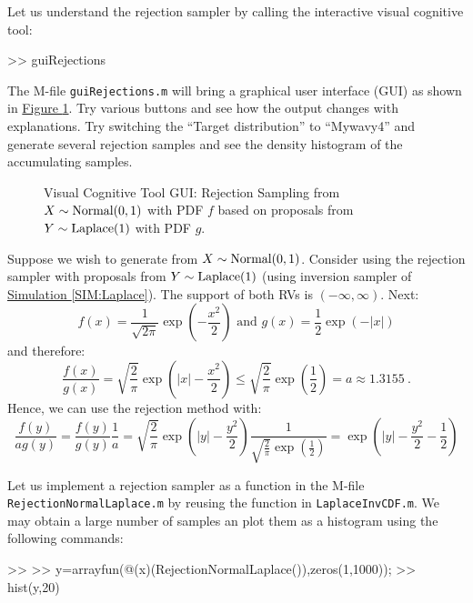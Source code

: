 \begin{labwork}\label{LW:guiRejectionsNormal01}
Let us understand the rejection sampler by calling the interactive visual cognitive tool:
\begin{VrbM}
>> guiRejections
\end{VrbM}
The M-file {\tt guiRejections.m} will bring a graphical user interface (GUI) as shown in \hyperref[F:guiRejectionsNormal01]{Figure \ref*{F:guiRejectionsNormal01}}.  Try various buttons and see how the output changes with explanations.  Try switching the ``Target distribution'' to ``Mywavy4'' and generate several rejection samples and see the density histogram of the accumulating samples.
\end{labwork}

\begin{figure}[htpb]
\caption{Visual Cognitive Tool GUI: Rejection Sampling from $X \sim \mbox{{\rm Normal}}(0,1)$ with PDF $f$ based on proposals from $Y \sim \mbox{{\rm Laplace}}(1)$ with PDF $g$.\label{F:guiRejectionsNormal01}}
\centering   {}
\end{figure}


\begin{simulation}\label{SIM:Normal01FromLaplace}
Suppose we wish to generate from $X \sim \mbox{{\rm Normal}}(0, 1)$. Consider using the rejection sampler with proposals from $Y \sim \mbox{{\rm Laplace}}(1)$ (using inversion sampler of \hyperref[SIM:Laplace]{Simulation \ref*{SIM:Laplace}}). The support of both RVs is $(-\infty,\infty)$. Next:
$$f(x)=\frac{1}{\sqrt{2\pi}}\exp\left(-\frac{x^2}{2}\right) \textrm{ and } g(x)=\frac{1}{2}\exp(-|x|)$$
and therefore:
$$\frac{f(x)}{g(x)}=\sqrt{\frac{2}{\pi}}\exp\left(|x|-\frac{x^2}{2}\right)\leq \sqrt{\frac{2}{\pi}}\exp\left(\frac{1}{2}\right) = a \approx 1.3155 \ .$$
Hence, we can use the rejection method with:
$$
\frac{f(y)}{a g(y)} = \frac{f(y)}{g(y)} \frac{1}{a} = \sqrt{\frac{2}{\pi}}\exp\left(|y|-\frac{y^2}{2}\right) \frac{1}{\sqrt{\frac{2}{\pi}}\exp\left(\frac{1}{2}\right)  } = \exp\left(|y|-\frac{y^2}{2} - \frac{1}{2} \right)
$$

Let us implement a rejection sampler as a function in the M-file {\tt RejectionNormalLaplace.m} by reusing the function in {\tt LaplaceInvCDF.m}.
We may obtain a large number of samples an plot them as a histogram using the following commands:
\begin{VrbM}
>> %
>> y=arrayfun(@(x)(RejectionNormalLaplace()),zeros(1,1000));
>> hist(y,20) %
\end{VrbM}
\end{simulation}

